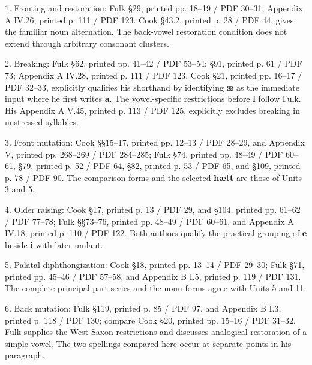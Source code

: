 1. Fronting and restoration: Fulk §29, printed pp. 18–19 / PDF 30–31; Appendix A IV.26, printed p. 111 / PDF 123. Cook §43.2, printed p. 28 / PDF 44, gives the familiar noun alternation. The back-vowel restoration condition does not extend through arbitrary consonant clusters.\par
2. Breaking: Fulk §62, printed pp. 41–42 / PDF 53–54; §91, printed p. 61 / PDF 73; Appendix A IV.28, printed p. 111 / PDF 123. Cook §21, printed pp. 16–17 / PDF 32–33, explicitly qualifies his shorthand by identifying \textbf{æ} as the immediate input where he first writes \textbf{a}. The vowel-specific restrictions before \textbf{l} follow Fulk. His Appendix A V.45, printed p. 113 / PDF 125, explicitly excludes breaking in unstressed syllables.\par
3. Front mutation: Cook §§15–17, printed pp. 12–13 / PDF 28–29, and Appendix V, printed pp. 268–269 / PDF 284–285; Fulk §74, printed pp. 48–49 / PDF 60–61, §79, printed p. 52 / PDF 64, §82, printed p. 53 / PDF 65, and §109, printed p. 78 / PDF 90. The comparison forms and the selected \textbf{hǣtt} are those of Units 3 and 5.\par
4. Older raising: Cook §17, printed p. 13 / PDF 29, and §104, printed pp. 61–62 / PDF 77–78; Fulk §§73–76, printed pp. 48–49 / PDF 60–61, and Appendix A IV.18, printed p. 110 / PDF 122. Both authors qualify the practical grouping of \textbf{e} beside \textbf{i} with later umlaut.\par
5. Palatal diphthongization: Cook §18, printed pp. 13–14 / PDF 29–30; Fulk §71, printed pp. 45–46 / PDF 57–58, and Appendix B I.5, printed p. 119 / PDF 131. The complete principal-part series and the noun forms agree with Units 5 and 11.\par
6. Back mutation: Fulk §119, printed p. 85 / PDF 97, and Appendix B I.3, printed p. 118 / PDF 130; compare Cook §20, printed pp. 15–16 / PDF 31–32. Fulk supplies the West Saxon restrictions and discusses analogical restoration of a simple vowel. The two spellings compared here occur at separate points in his paragraph.\par

